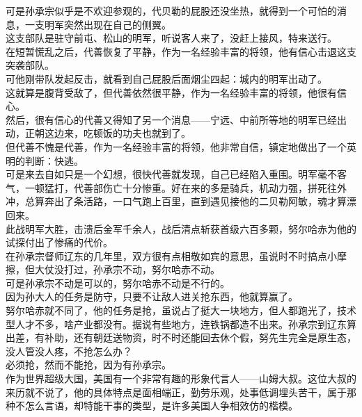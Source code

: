 \begin{multicols}{\theparacolNo}
可是孙承宗似乎是不欢迎参观的，代贝勒的屁股还没坐热，就得到一个可怕的消息，一支明军突然出现在自己的侧翼。\\

这支部队是驻守前屯、松山的明军，听说客人来了，没赶上接风，特来送行。\\

在短暂慌乱之后，代善恢复了平静，作为一名经验丰富的将领，他有信心击退这支突袭部队。\\

可他刚带队发起反击，就看到自己屁股后面烟尘四起：城内的明军出动了。\\

这就算是腹背受敌了，但代善依然很平静，作为一名经验丰富的将领，他很有信心。\\

然后，很有信心的代善又得知了另一个消息——宁远、中前所等地的明军已经出动，正朝这边来，吃顿饭的功夫也就到了。\\

但代善不愧是代善，作为一名经验丰富的将领，他非常自信，镇定地做出了一个英明的判断：快逃。\\

可是来去自如只是一个幻想，很快代善就发现，自己已经陷入重围。明军毫不客气，一顿猛打，代善部伤亡十分惨重。好在来的多是骑兵，机动力强，拼死往外冲，总算奔出了条活路，一口气跑上百里，直到遇见接他的二贝勒阿敏，魂才算漂回来。\\

此战明军大胜，击溃后金军千余人，战后清点斩获首级六百多颗，努尔哈赤为他的试探付出了惨痛的代价。\\

在孙承宗督师辽东的几年里，双方很有点相敬如宾的意思，虽说时不时搞点小摩擦，但大仗没打过，孙承宗不动，努尔哈赤不动。\\

可是孙承宗不动是可以的，努尔哈赤不动是不行的。\\

因为孙大人的任务是防守，只要不让敌人进关抢东西，他就算赢了。\\

努尔哈赤就不同了，他的任务是抢，虽说占了挺大一块地方，但人都跑光了，技术型人才不多，啥产业都没有。据说有些地方，连铁锅都造不出来。孙承宗到辽东算出差，有补助，还有朝廷送物资，时不时还能回去休个假，努先生完全是原生态，没人管没人疼，不抢怎么办？\\

必须抢，然而不能抢，因为有孙承宗。\\

作为世界超级大国，美国有一个非常有趣的形象代言人——山姆大叔。这位大叔的来历就不说了，他的具体特点是面相端正，勤劳乐观，处事低调埋头苦干，属于那种不怎么言语，却特能干事的类型，是许多美国人争相效仿的楷模。\\


\end{multicols}

